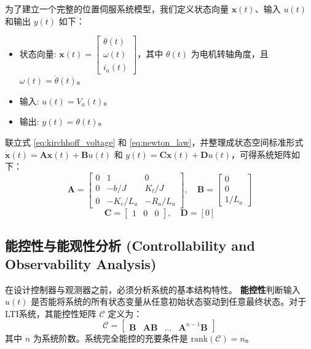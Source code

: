\documentclass[12pt, a4paper]{article}
\begin{document}
为了建立一个完整的位置伺服系统模型，我们定义状态向量 $\bm{x}(t)$、输入 $u(t)$ 和输出 $y(t)$ 如下：
\begin{itemize}
    \item 状态向量: $\bm{x}(t) = \begin{bmatrix} \theta(t) \\ \omega(t) \\ i_a(t) \end{bmatrix}$，其中 $\theta(t)$ 为电机转轴角度，且 $\omega(t) = \dot{\theta}(t)$。
    \item 输入: $u(t) = V_a(t)$。
    \item 输出: $y(t) = \theta(t)$。
\end{itemize}
联立式 \eqref{eq:kirchhoff_voltage} 和 \eqref{eq:newton_law}，并整理成状态空间标准形式 $\dot{\bm{x}}(t) = \bm{A}\bm{x}(t) + \bm{B}u(t)$ 和 $y(t) = \bm{C}\bm{x}(t) + \bm{D}u(t)$，可得系统矩阵如下：
\begin{equation}
    \bm{A} = 
    \begin{bmatrix}
        0 & 1 & 0 \\
        0 & -b/J & K_t/J \\
        0 & -K_e/L_a & -R_a/L_a
    \end{bmatrix},
    \quad
    \bm{B} = 
    \begin{bmatrix}
        0 \\ 0 \\ 1/L_a
    \end{bmatrix}
    \label{eq:matrix_A_B}
\end{equation}
\begin{equation}
    \bm{C} = 
    \begin{bmatrix}
        1 & 0 & 0
    \end{bmatrix},
    \quad
    \bm{D} = [0]
    \label{eq:matrix_C_D}
\end{equation}

\subsection{能控性与能观性分析 (Controllability and Observability Analysis)}
在设计控制器与观测器之前，必须分析系统的基本结构特性。
\textbf{能控性}判断输入 $u(t)$ 是否能将系统的所有状态变量从任意初始状态驱动到任意最终状态。对于LTI系统，其能控性矩阵 $\mathcal{C}$ 定义为：
\begin{equation}
    \mathcal{C} = 
    \begin{bmatrix}
        \bm{B} & \bm{AB} & \dots & \bm{A}^{n-1}\bm{B}
    \end{bmatrix}
    \label{eq:controllability}
\end{equation}
其中 $n$ 为系统阶数。系统完全能控的充要条件是 $\mathrm{rank}(\mathcal{C}) = n$。
\end{document}
